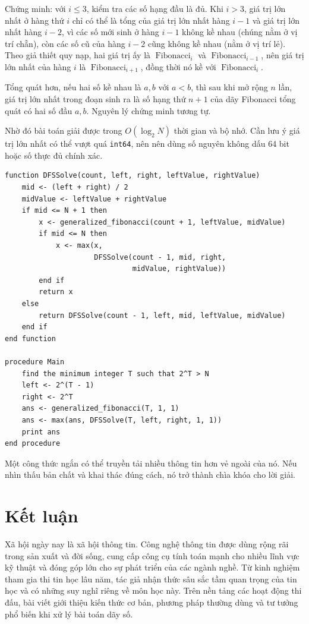 \documentclass[11pt]{article}
\begin{document}
Chứng minh: với $i\le3$, kiểm tra các số hạng đầu là đủ. Khi $i>3$, giá trị
lớn nhất ở hàng thứ $i$ chỉ có thể là tổng của giá trị lớn nhất hàng $i-1$ và
giá trị lớn nhất hàng $i-2$, vì các số mới sinh ở hàng $i-1$ không kề nhau
(chúng nằm ở vị trí chẵn), còn các số cũ của hàng $i-2$ cũng không kề nhau
(nằm ở vị trí lẻ). Theo giả thiết quy nạp, hai giá trị ấy là
$\operatorname{Fibonacci}_i$ và $\operatorname{Fibonacci}_{i-1}$, nên giá trị
lớn nhất của hàng $i$ là $\operatorname{Fibonacci}_{i+1}$, đồng thời nó kề với
$\operatorname{Fibonacci}_i$.

Tổng quát hơn, nếu hai số kề nhau là $a,b$ với $a<b$, thì sau khi mở rộng
$n$ lần, giá trị lớn nhất trong đoạn sinh ra là số hạng thứ $n+1$ của dãy
Fibonacci tổng quát có hai số đầu $a,b$. Nguyên lý chứng minh tương tự.

Nhờ đó bài toán giải được trong $O(\log_2 N)$ thời gian và bộ nhớ. Cần lưu ý
giá trị lớn nhất có thể vượt quá \texttt{int64}, nên nên dùng số nguyên không
dấu 64 bit hoặc số thực đủ chính xác.

\begin{lstlisting}
function DFSSolve(count, left, right, leftValue, rightValue)
    mid <- (left + right) / 2
    midValue <- leftValue + rightValue
    if mid <= N + 1 then
        x <- generalized_fibonacci(count + 1, leftValue, midValue)
        if mid <= N then
            x <- max(x,
                     DFSSolve(count - 1, mid, right,
                              midValue, rightValue))
        end if
        return x
    else
        return DFSSolve(count - 1, left, mid, leftValue, midValue)
    end if
end function

procedure Main
    find the minimum integer T such that 2^T > N
    left <- 2^(T - 1)
    right <- 2^T
    ans <- generalized_fibonacci(T, 1, 1)
    ans <- max(ans, DFSSolve(T, left, right, 1, 1))
    print ans
end procedure
\end{lstlisting}

Một công thức ngắn có thể truyền tải nhiều thông tin hơn vẻ ngoài của nó. Nếu
nhìn thấu bản chất và khai thác đúng cách, nó trở thành chìa khóa cho lời giải.

\section{Kết luận}

Xã hội ngày nay là xã hội thông tin. Công nghệ thông tin được dùng rộng rãi
trong sản xuất và đời sống, cung cấp công cụ tính toán mạnh cho nhiều lĩnh vực
kỹ thuật và đóng góp lớn cho sự phát triển của các ngành nghề. Từ kinh nghiệm
tham gia thi tin học lâu năm, tác giả nhận thức sâu sắc tầm quan trọng của tin
học và có những suy nghĩ riêng về môn học này. Trên nền tảng các hoạt động thi
đấu, bài viết giới thiệu kiến thức cơ bản, phương pháp thường dùng và tư tưởng
phổ biến khi xử lý bài toán dãy số.
\end{document}
